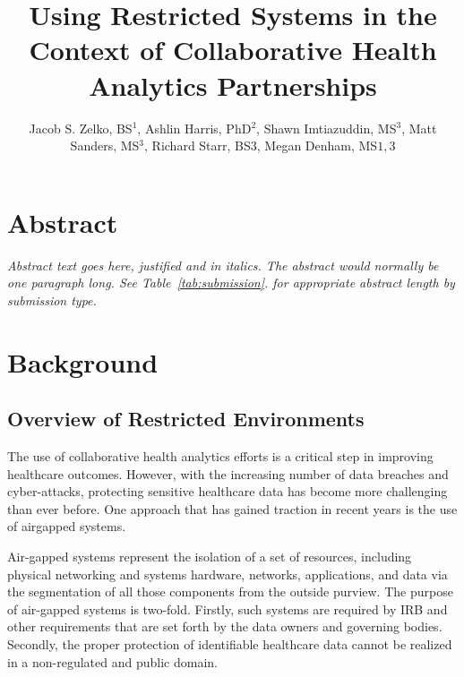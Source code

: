 \documentclass{amia}
\begin{document}
\title{Using Restricted Systems in the Context of Collaborative Health Analytics Partnerships}

\author{Jacob S. Zelko, BS$^1$, Ashlin Harris, PhD$^2$, Shawn Imtiazuddin, MS$^3$, Matt Sanders, MS$^3$, Richard Starr, BS$3$, Megan Denham, MS$1,3$}


\maketitle

\section*{Abstract}

\textit{Abstract text goes here, justified and in italics.  The abstract would normally be one paragraph long.  See Table~\ref{tab:submission}. for appropriate abstract length by submission type.}

\section*{Background}

\subsection{Overview of Restricted Environments}

The use of collaborative health analytics efforts is a critical step in improving healthcare outcomes. However, with the increasing number of data breaches and cyber-attacks, protecting sensitive healthcare data has become more challenging than ever before. One approach that has gained traction in recent years is the use of airgapped systems.

Air-gapped systems represent the isolation of a set of resources, including physical networking and systems hardware, networks, applications, and data via the segmentation of all those components from the outside purview. The purpose of air-gapped systems is two-fold. Firstly, such systems are required by IRB and other requirements that are set forth by the data owners and governing bodies. Secondly, the proper protection of identifiable healthcare data cannot be realized in a non-regulated and public domain.
\end{document}
